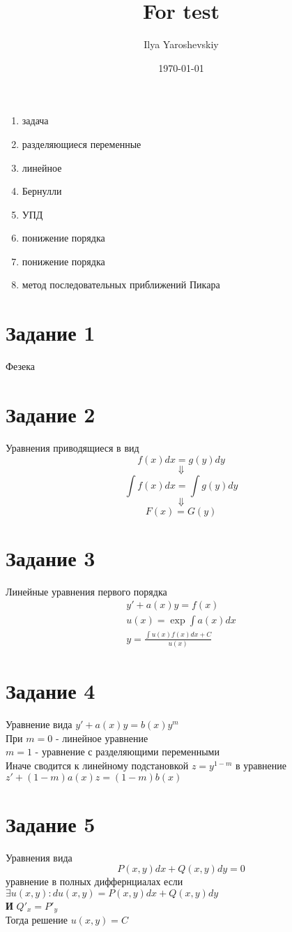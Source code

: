 \documentclass{article}
\author{Ilya Yaroshevskiy}
\date{\today}
\title{For test}
\begin{document}
\maketitle
\tableofcontents

\begin{enumerate}
\item задача
\item разделяющиеся переменные
\item линейное
\item Бернулли
\item УПД
\item понижение порядка
\item понижение порядка
\item метод последовательных приближений Пикара
\end{enumerate}

\section{Задание 1}
\label{sec:org5b748f8}
Фезека
\section{Задание 2}
\label{sec:orgf007b50}
Уравнения приводящиеся в вид
\[ f(x)dx = g(y)dy \]
\[ \Downarrow \]
\[ \int f(x)dx = \int g(y)dy \]
\[ \Downarrow \]
\[ F(x) = G(y) \]
\section{Задание 3}
\label{sec:orga4d9313}
Линейные уравнения первого порядка
\begin{gather*}
y' + a(x)y = f(x) \\
u(x) = \exp{\int{a(x)dx}} \\
y = \frac{\int{u(x)f(x)dx} + C}{u(x)}
\end{gather*}
\section{Задание 4}
\label{sec:orgc067e88}
Уравнение вида \(y' + a(x)y = b(x)y^m\) \\
При \(m = 0\) - линейное уравнение \\
    \(m = 1\) - уравнение с разделяющими переменными \\
Иначе сводится к линейному подстановкой \(z = y^{1 - m}\) в уравнение 
\(z' + (1 - m)a(x)z = (1 - m)b(x)\) 
\section{Задание 5}
\label{sec:orgc2c5772}
Уравнения вида
\[ P(x, y)dx + Q(x, y)dy = 0 \]
уравнение в полных диффернциалах если \(\exists u(x, y): du(x, y) = P(x, y)dx + Q(x, y)dy\) \\
\textbf{И} \(Q'_x = P'_y\) \\
Тогда решение \(u(x, y) = C\)
\end{document}
